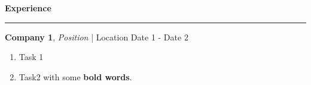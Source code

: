 

\textbf{Experience}

\par\noindent\rule{\textwidth}{0.2pt}


{\textbf{Company 1}, \textnormal{\textit{Position} | Location}} \hfill {Date 1 - Date 2} 
{%
    \begin{enumerate}
        \item {Task 1}
        \item {Task2 with some \textbf{bold words}.}
    \end{enumerate}
}
